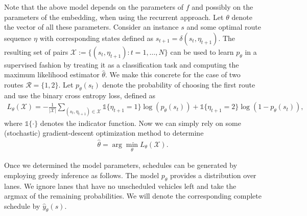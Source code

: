\documentclass[a4paper]{article}
\theoremstyle{definition}
\theoremstyle{plain}
\begin{document}
Note that the above model depends on the parameters of $f$ and possibly on the
parameters of the embedding, when using the recurrent approach. Let $\theta$
denote the vector of all these parameters.
Consider an instance $s$ and some optimal route sequence $\eta$ with
corresponding states defined as $s_{t+1} = \delta(s_{t}, \eta_{t+1})$. The
resulting set of pairs $\mathcal{X} := \{ (s_{t}, \eta_{t+1}) : t = 1, \dots, N \}$ can be used to learn $p_{\theta}$
in a supervised fashion by treating it as a classification task and computing the maximum likelihood estimator $\hat{\theta}$.
%
We make this concrete for the case of two routes $\mathcal{R} = \{ 1, 2\}$.
Let $p_{\theta}(s_{t})$ denote the probability of choosing the first route and use the
binary cross entropy loss, defined as
\begin{align*}
  L_{\theta}(\mathcal{X}) = - \frac{1}{|\mathcal{X}|} \sum_{(s_{t}, \eta_{t+1}) \in \mathcal{X}} \mathds{1}\{\eta_{t+1} = 1\} \log(p_{\theta}(s_{t})) + \mathds{1}\{\eta_{t+1} = 2\} \log(1 - p_{\theta}(s_{t})) ,
\end{align*}
where $\mathds{1}\{\cdot\}$ denotes the indicator function. Now we can simply rely on
some (stochastic) gradient-descent optimization method to determine
\begin{align*}
  \hat{\theta} = \arg\min_{\theta} L_{\theta}(\mathcal{X}) .
\end{align*}

Once we determined the model parameters, schedules can be generated by employing
greedy inference as follows. The model $p_{\theta}$ provides a distribution over
lanes. We ignore lanes that have no unscheduled vehicles left and take the
argmax of the remaining probabilities. We will denote the corresponding complete
schedule by $\hat{y}_{\theta}(s)$.
\end{document}
